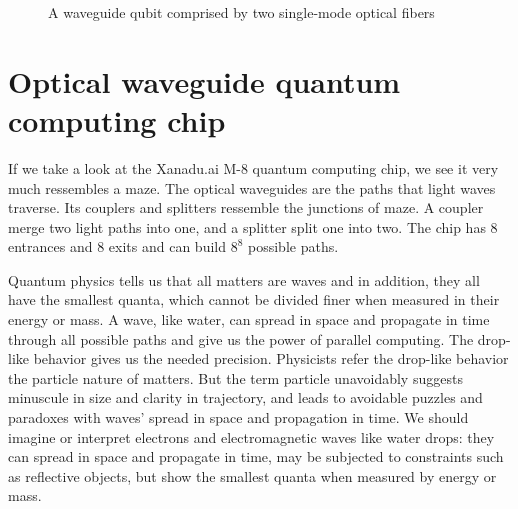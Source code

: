 \documentclass[Letter,11pt]{book}
\begin{document}
\begin{figure}[ht]\label{Fiber}
\caption{A waveguide qubit comprised by two single-mode optical fibers}
\end{figure}

\section{Optical waveguide quantum computing chip}
If we take a look at the Xanadu.ai M-8 quantum computing chip, we see it very much ressembles a maze. The optical waveguides are the paths that light waves traverse. Its couplers and splitters ressemble the junctions of maze. A coupler merge two light paths into one, and a splitter split one into two. The chip has 8 entrances and 8 exits and can build $8^8$ possible paths.

Quantum physics tells us that all matters are waves and in addition, they all have the smallest quanta, which cannot be divided finer when measured in their energy or mass. A wave, like water, can spread in space and propagate in time through all possible paths and give us the power of parallel computing. The drop-like behavior gives us the needed precision. Physicists refer the drop-like behavior the particle nature of matters. But the term particle unavoidably suggests minuscule in size and clarity in trajectory, and leads to avoidable puzzles and paradoxes with waves' spread in space and propagation in time. We should imagine or interpret electrons and electromagnetic waves like water drops: they can spread in space and propagate in time, may be subjected to constraints such as reflective objects, but show the smallest quanta when measured by energy or mass.
\end{document}
